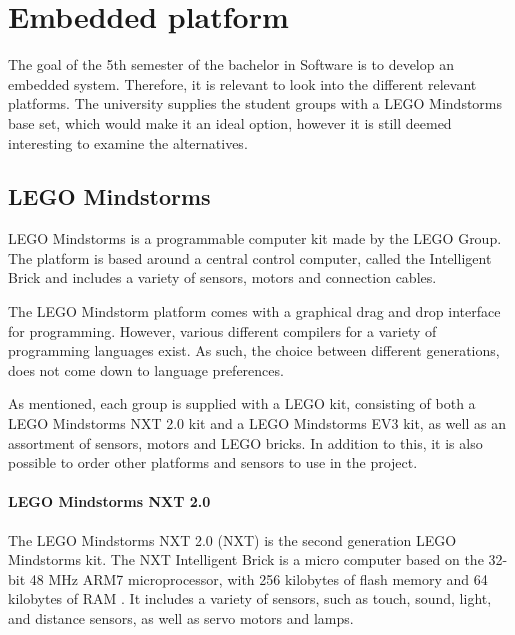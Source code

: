 

\section{Embedded platform}
The goal of the 5th semester of the bachelor in Software is to develop an embedded system.
Therefore, it is relevant to look into the different relevant platforms.
The university supplies the student groups with a LEGO Mindstorms base set, which would make it an ideal option, however it is still deemed interesting to examine the alternatives.

\subsection{LEGO Mindstorms}
LEGO Mindstorms is a programmable computer kit made by the LEGO Group.
The platform is based around a central control computer, called the Intelligent Brick and includes a variety of sensors, motors and connection cables.

The LEGO Mindstorm platform comes with a graphical drag and drop interface for programming.
However, various different compilers for a variety of programming languages exist.
As such, the choice between different generations, does not come down to language preferences.

As mentioned, each group is supplied with a LEGO kit, consisting of both a LEGO Mindstorms NXT 2.0 kit and a LEGO Mindstorms EV3 kit, as well as an assortment of sensors, motors and LEGO bricks.
In addition to this, it is also possible to order other platforms and sensors to use in the project.

\paragraph{LEGO Mindstorms NXT 2.0}
The LEGO Mindstorms NXT 2.0 (NXT) is the second generation LEGO Mindstorms kit.
The NXT Intelligent Brick is a micro computer based on the 32-bit 48 MHz ARM7 microprocessor, with 256 kilobytes of flash memory and 64 kilobytes of RAM \cite{nxt2userguide} \cite{nxt2ev3compare}.
It includes a variety of sensors, such as touch, sound, light, and distance sensors, as well as servo motors and lamps.

